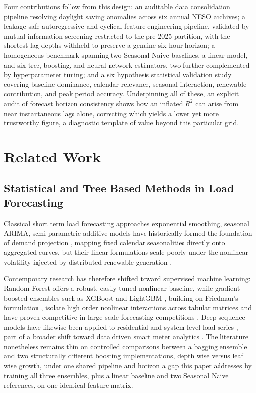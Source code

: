 \documentclass[runningheads]{llncs}
\begin{document}
Four contributions follow from this design: an auditable data consolidation pipeline resolving daylight saving anomalies across six annual NESO archives; a leakage safe autoregressive and cyclical feature engineering pipeline, validated by mutual information screening restricted to the pre 2025 partition, with the shortest lag depths withheld to preserve a genuine six hour horizon; a homogeneous benchmark spanning two Seasonal Naive baselines, a linear model, and six tree, boosting, and neural network estimators, two further complemented by hyperparameter tuning; and a six hypothesis statistical validation study covering baseline dominance, calendar relevance, seasonal interaction, renewable contribution, and peak period accuracy. Underpinning all of these, an explicit audit of forecast horizon consistency shows how an inflated $R^2$ can arise from near instantaneous lags alone, correcting which yields a lower yet more trustworthy figure, a diagnostic template of value beyond this particular grid.

\section{Related Work}
\label{sec:related}

\subsection{Statistical and Tree Based Methods in Load Forecasting}

Classical short term load forecasting approaches exponential smoothing, seasonal ARIMA, semi parametric additive models have historically formed the foundation of demand projection \cite{box2015time,zhang2003time}, mapping fixed calendar seasonalities directly onto aggregated curves, but their linear formulations scale poorly under the nonlinear volatility injected by distributed renewable generation \cite{hippert2001neural}.

Contemporary research has therefore shifted toward supervised machine learning: Random Forest \cite{breiman2001random} offers a robust, easily tuned nonlinear baseline, while gradient boosted ensembles such as XGBoost \cite{chen2016xgboost} and LightGBM \cite{ke2017lightgbm}, building on Friedman's formulation \cite{friedman2001greedy}, isolate high order nonlinear interactions across tabular matrices and have proven competitive in large scale forecasting competitions \cite{taieb2014gradient,hong2016gefcom}. Deep sequence models have likewise been applied to residential and system level load series \cite{kong2019short}, part of a broader shift toward data driven smart meter analytics \cite{wang2019review}. The literature nonetheless remains thin on controlled comparisons between a bagging ensemble and two structurally different boosting implementations, depth wise versus leaf wise growth, under one shared pipeline and horizon a gap this paper addresses by training all three ensembles, plus a linear baseline and two Seasonal Naive references, on one identical feature matrix.
\end{document}
